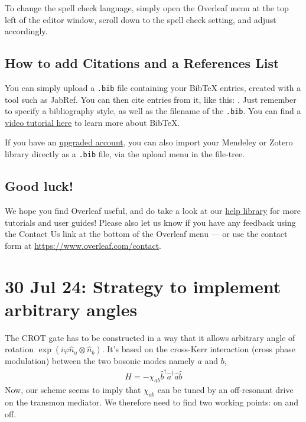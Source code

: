 \documentclass{article}
\begin{document}
To change the spell check language, simply open the Overleaf menu at the top left of the editor window, scroll down to the spell check setting, and adjust accordingly.

\subsection{How to add Citations and a References List}

You can simply upload a \verb|.bib| file containing your BibTeX entries, created with a tool such as JabRef. You can then cite entries from it, like this: \cite{greenwade93}. Just remember to specify a bibliography style, as well as the filename of the \verb|.bib|. You can find a \href{https://www.overleaf.com/help/97-how-to-include-a-bibliography-using-bibtex}{video tutorial here} to learn more about BibTeX.

If you have an \href{https://www.overleaf.com/user/subscription/plans}{upgraded account}, you can also import your Mendeley or Zotero library directly as a \verb|.bib| file, via the upload menu in the file-tree.

\subsection{Good luck!}

We hope you find Overleaf useful, and do take a look at our \href{https://www.overleaf.com/learn}{help library} for more tutorials and user guides! Please also let us know if you have any feedback using the Contact Us link at the bottom of the Overleaf menu --- or use the contact form at \url{https://www.overleaf.com/contact}.

\section{30 Jul 24: Strategy to implement arbitrary angles}

The CROT gate has to be constructed in a way that it allows arbitrary angle of rotation $\exp(i\varphi\hat{n}_a\otimes\hat{n}_b)$. It's based on the cross-Kerr interaction (cross phase modulation) between the two bosonic modes namely $a$ and $b$,
\begin{align}
    H = -\chi_{ab}\hat{b}^\dagger\hat{a}^\dagger\hat{a}\hat{b}
\end{align}
Now, our scheme seems to imply that $\chi_{ab}$ can be tuned by an off-resonant drive on the transmon mediator. We therefore need to find two working points: on and off.


\end{document}
